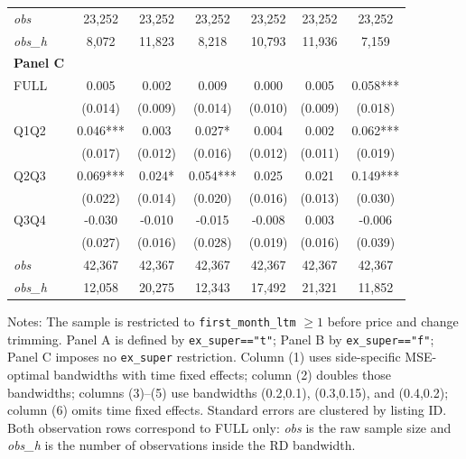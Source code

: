 \begin{table}[!htbp]
\begin{tabular}{lcccccc}
\textit{obs} & 23,252 & 23,252 & 23,252 & 23,252 & 23,252 & 23,252 \\
\textit{obs\_h} &  8,072 & 11,823 &  8,218 & 10,793 & 11,936 &  7,159 \\

\textbf{Panel C} &&&&&&  \\

FULL & 0.005 & 0.002 & 0.009 & 0.000 & 0.005 & 0.058*** \\
 & (0.014) & (0.009) & (0.014) & (0.010) & (0.009) & (0.018) \\
Q1Q2 & 0.046*** & 0.003 & 0.027* & 0.004 & 0.002 & 0.062*** \\
 & (0.017) & (0.012) & (0.016) & (0.012) & (0.011) & (0.019) \\
Q2Q3 & 0.069*** & 0.024* & 0.054*** & 0.025 & 0.021 & 0.149*** \\
 & (0.022) & (0.014) & (0.020) & (0.016) & (0.013) & (0.030) \\
Q3Q4 & -0.030 & -0.010 & -0.015 & -0.008 & 0.003 & -0.006 \\
 & (0.027) & (0.016) & (0.028) & (0.019) & (0.016) & (0.039) \\

\textit{obs} & 42,367 & 42,367 & 42,367 & 42,367 & 42,367 & 42,367 \\
\textit{obs\_h} & 12,058 & 20,275 & 12,343 & 17,492 & 21,321 & 11,852 \\

\bottomrule
\end{tabular}
\begin{minipage}{0.98\textwidth}\footnotesize
Notes: The sample is restricted to \texttt{first\_month\_ltm} $\geq 1$ before price and change trimming. Panel A is defined by \texttt{ex\_super=="t"}; Panel B by \texttt{ex\_super=="f"}; Panel C imposes no \texttt{ex\_super} restriction. Column (1) uses side-specific MSE-optimal bandwidths with time fixed effects; column (2) doubles those bandwidths; columns (3)--(5) use bandwidths (0.2,0.1), (0.3,0.15), and (0.4,0.2); column (6) omits time fixed effects. Standard errors are clustered by listing ID. Both observation rows correspond to FULL only: \textit{obs} is the raw sample size and \textit{obs\_h} is the number of observations inside the RD bandwidth.
\end{minipage}
\end{table}
\clearpage
